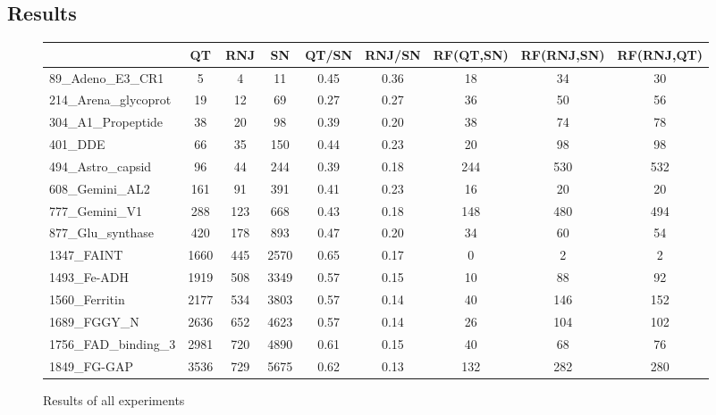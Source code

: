\documentclass[a4paper,oneside,article,11pt]{memoir}
\begin{document}
\subsection*{Results }
\begin{figure}[H]
\begin{adjustwidth}{-2.3cm}{}
\begin{tabular}{l|c|c|c|c|c|c|c|c}
						& QT 	& RNJ 	& SN		& QT/SN 		& RNJ/SN & RF(QT,SN)	& RF(RNJ,SN) & RF(RNJ,QT) 	\\\hline
89\_Adeno\_E3\_CR1 		& 5 		& 4 		& 11   	& 0.45	 	& 0.36	 & 18		& 34			 & 30 			\\\hline
214\_Arena\_glycoprot 	& 19 	& 12 	& 69   	& 0.27 		& 0.27	 & 36		& 50			 & 56 			\\\hline
304\_A1\_Propeptide 		& 38 	& 20 	& 98   	& 0.39 		& 0.20	 & 38		& 74			 & 78 			\\\hline
401\_DDE 				& 66 	& 35 	& 150  	& 0.44 		& 0.23	 & 20		& 98			 & 98 			\\\hline
494\_Astro\_capsid 		& 96 	& 44 	& 244  	& 0.39 		& 0.18	 & 244		& 530		 & 532 			\\\hline
608\_Gemini\_AL2 		& 161 	& 91 	& 391  	& 0.41	 	& 0.23	 & 16		& 20			 & 20 			\\\hline
777\_Gemini\_V1 			& 288 	& 123 	& 668  	& 0.43 		& 0.18	 & 148		& 480		 & 494 			\\\hline
877\_Glu\_synthase 		& 420 	& 178 	& 893  	& 0.47 		& 0.20	 & 34		& 60			 & 54 			\\\hline
1347\_FAINT 				& 1660 	& 445	& 2570 	& 0.65 		& 0.17	 & 0			& 2			 & 2 			\\\hline
1493\_Fe-ADH 			& 1919 	& 508 	& 3349 	& 0.57 		& 0.15	 & 10		& 88			 & 92 			\\\hline
1560\_Ferritin 			& 2177 	& 534 	& 3803 	& 0.57 		& 0.14	 & 40		& 146		 & 152 			\\\hline
1689\_FGGY\_N 			& 2636 	& 652 	& 4623 	& 0.57 		& 0.14	 & 26		& 104		 & 102 			\\\hline
1756\_FAD\_binding\_3 	& 2981 	& 720 	& 4890 	& 0.61 		& 0.15	 & 40		& 68			 & 76 			\\\hline
1849\_FG-GAP 			& 3536 	& 729 	& 5675 	& 0.62 		& 0.13	 & 132		& 282		 & 280
\end{tabular}
\caption{\label{tab:results}Results of all experiments}
\end{adjustwidth}
\end{figure}
\end{document}

